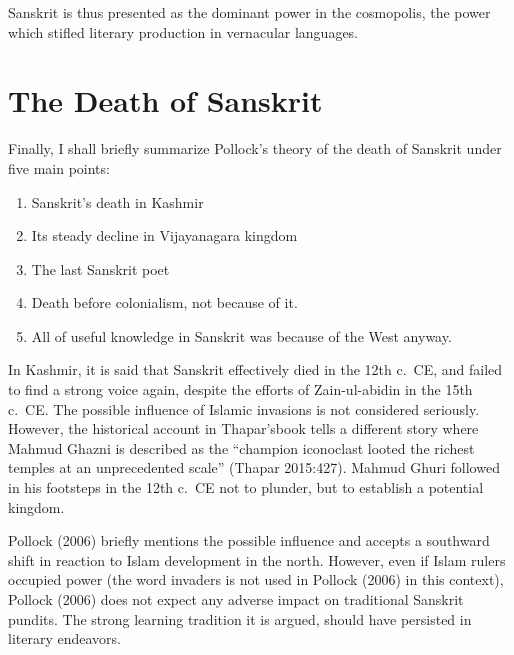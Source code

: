 Sanskrit is thus presented as the dominant power in the cosmopolis, the power which stifled literary production in vernacular languages.
\vskip -10pt

\section{The Death of Sanskrit}
\vskip -3pt

Finally, I shall briefly summarize Pollock’s theory of the death of Sanskrit under five main points:

\begin{enumerate}
\item Sanskrit’s death in Kashmir
\item Its steady decline in Vijayanagara kingdom
\item The last Sanskrit poet
\item Death before colonialism, not because of it. 
\item All of useful knowledge in Sanskrit was because of the West anyway.
\end{enumerate}

In Kashmir, it is said that Sanskrit effectively died in the 12th c.\ CE, and failed to find a strong voice again, despite the efforts of Zain-ul-abidin in the 15th c.\ CE. The possible influence of Islamic invasions is not considered seriously. However, the historical account in Thapar’sbook tells a different story where Mahmud Ghazni is described as the “champion iconoclast looted the richest temples at an unprecedented scale” (Thapar 2015:427). Mahmud Ghuri followed in his footsteps in the 12th c.\ CE not to plunder, but to establish a potential kingdom.
\vskip 1.5pt

Pollock (2006) briefly mentions the possible influence and accepts a southward shift in reaction to Islam development in the north. However, even if Islam rulers occupied power (the word invaders is not used in Pollock (2006) in this context), Pollock (2006) does not expect any adverse impact on traditional Sanskrit pundits. The strong learning tradition it is argued, should have persisted in literary endeavors. 
\vskip 1.5pt


